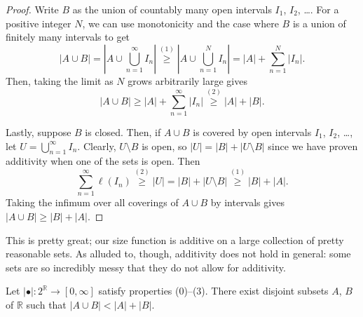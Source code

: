 \documentclass[11pt]{scrartcl}
\providecommand{\RR}{\mathbb R}
\providecommand{\abs}[1]{\left\lvert #1\right\rvert}
\begin{document}
\begin{proof}
    Write $B$ as the union of countably many open intervals $I_1$, $I_2$, \dots.
    For a positive integer $N$, we can use monotonicity
    and the case where $B$ is a union of finitely many intervals to get
    \begin{equation*}
	\abs{A\cup B} = \abs{A\cup \bigcup_{n=1}^\infty I_n} \overset{(1)}\ge
	\abs{A\cup \bigcup_{n=1}^N I_n} = \abs A + \sum_{n=1}^N \abs{I_n}.
    \end{equation*}
    Then, taking the limit as $N$ grows arbitrarily large gives
    \begin{equation*}
	\abs{A\cup B} \ge \abs A + \sum_{n=1}^\infty \abs{I_n}
	\overset{(2)}\ge \abs A + \abs B.
    \end{equation*}

    Lastly, suppose $B$ is closed. Then, if $A\cup B$ is covered by
    open intervals $I_1$, $I_2$, \dots, let $U = \bigcup_{n=1}^\infty I_n$.
    Clearly, $U\setminus B$ is open, so $\abs U = \abs B + \abs{U\setminus B}$
    since we have proven additivity when one of the sets is open. Then
    \begin{equation*}
	\sum_{n=1}^\infty \ell(I_n) \overset{(2)}\ge
	\abs U = \abs B + \abs{U\setminus B} \overset{(1)}\ge \abs B + \abs A.
    \end{equation*}
    Taking the infimum over all coverings of $A\cup B$ by intervals
    gives $\abs{A\cup B}\ge \abs B + \abs A$.
\end{proof}

This is pretty great; our size function is additive
on a large collection of pretty reasonable sets.
As alluded to, though, additivity does not hold in general:
some sets are so incredibly messy that they do not allow for additivity.
\begin{prop}
    \label{prop:additivity-fails}
    Let $\abs\bullet\colon2^\RR\to[0,\infty]$
    satisfy properties (0)--(3).
    There exist disjoint subsets $A$, $B$ of $\RR$
    such that $\abs{A\cup B} < \abs A + \abs B$.
\end{prop}
\end{document}
